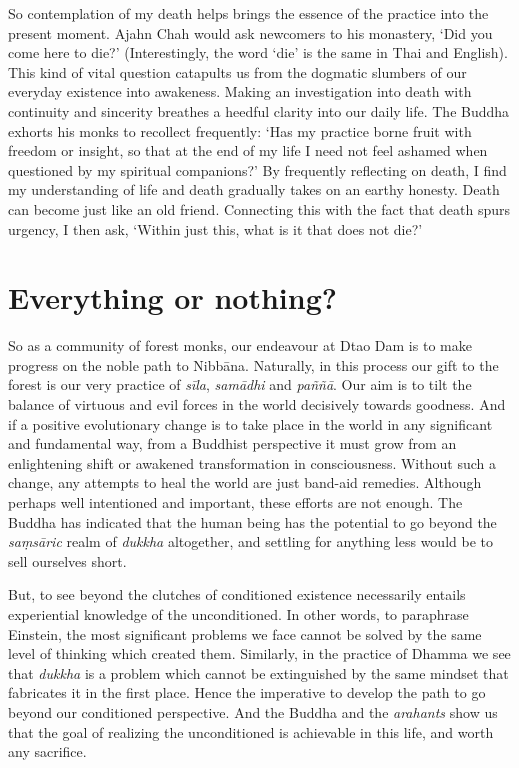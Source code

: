 So contemplation of my death helps brings the essence of the practice
into the present moment. Ajahn Chah would ask newcomers to his
monastery, `Did you come here to die?' (Interestingly, the word `die' is
the same in Thai and English). This kind of vital question catapults us
from the dogmatic slumbers of our everyday existence into awakeness. 
Making an investigation into death with continuity and sincerity
breathes a heedful clarity into our daily life. The Buddha exhorts his
monks to recollect frequently: `Has my practice borne fruit with freedom
or insight, so that at the end of my life I need not feel ashamed when
questioned by my spiritual companions?' By frequently reflecting
on death, I find my understanding of life and death gradually takes on
an earthy honesty. Death can become just like an old friend. Connecting
this with the fact that death spurs urgency, I then ask, `Within just
this, what is it that does not die?'

\section{Everything or nothing?}

So as a community of forest monks, our endeavour at Dtao Dam is to make
progress on the noble path to Nibbāna. Naturally, in this process our
gift to the forest is our very practice of \emph{sīla}, \emph{samādhi}
and \emph{paññā}. Our aim is to tilt the balance of virtuous and evil
forces in the world decisively towards goodness. And if a positive
evolutionary change is to take place in the world in any significant and
fundamental way, from a Buddhist perspective it must grow from an
enlightening shift or awakened transformation in consciousness. Without
such a change, any attempts to heal the world are just band-aid remedies. 
Although perhaps well intentioned and important, these efforts are not
enough. The Buddha has indicated that the human being has the potential
to go beyond the \emph{saṃsāric} realm of \emph{dukkha} altogether, and
settling for anything less would be to sell ourselves short. 

But, to see beyond the clutches of conditioned existence necessarily
entails experiential knowledge of the unconditioned. In other words, to
paraphrase Einstein, the most significant problems we face cannot be
solved by the same level of thinking which created them. Similarly, in
the practice of Dhamma we see that \emph{dukkha} is a problem which
cannot be extinguished by the same mindset that fabricates it in the
first place. Hence the imperative to develop the path to go beyond our
conditioned perspective. And the Buddha and the \emph{arahants} show us
that the goal of realizing the unconditioned is achievable in this life, 
and worth any sacrifice. 

